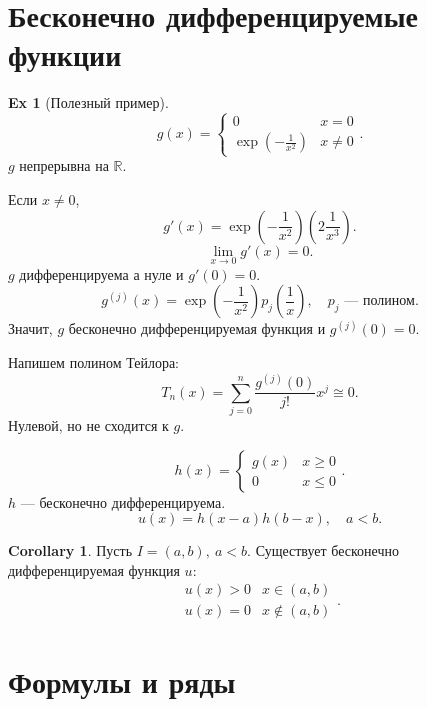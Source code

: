 \documentclass[11pt]{book}
\newcommand{\R}{\mathbb{R}}
\renewcommand{\le}{\leqslant}
\renewcommand{\ge}{\geqslant}
\theoremstyle{definition}
\theoremstyle{plain}
\theoremstyle{plain}
\theoremstyle{definition}
\newtheorem*{ex}{Ex}
\newtheorem*{cor}{Corollary}
\theoremstyle{remark}
\begin{document}
\section{Бесконечно дифференцируемые функции}
\begin{ex}[Полезный пример]
    \[
	g(x) = \left\{
	    \begin{array}{ll}
		0 & x = 0 \\
		\exp\left(-\frac{1}{x^2}\right) & x \ne 0
	\end{array}\right.
    .\]
    $ g $ непрерывна на $ \R$.

    Если $ x \ne 0$, \[
	g'(x) = \exp\left(-\frac{1}{x^2} \right)\left(2 \frac{1}{x^3}\right)
    .\]
    \[
	\lim_{x \to  0}  g'(x) = 0
    .\]
    $ g$  дифференцируема а нуле и $ g'(0) = 0$.
    \[
	g^{(j)} (x) = \exp\left(-\frac{1}{x^2}\right) p_j\left(\frac{1}{x}\right), \quad p_j \text{ --- полином}
    .\]
    Значит, $ g$ бесконечно дифференцируемая функция и $ g^{(j)} (0) = 0$.


    Напишем полином Тейлора:
    \[
	T_n(x) =\sum_{j=0}^{n} \frac{g^{(j)} (0)}{j!}x^{j} \cong 0
    .\]
    Нулевой, но не сходится к $ g$.

    \[
	h(x) = \left \{
	    \begin{array}{ll}
		g(x) & x \ge  0\\
		0 & x \le 0
	    \end{array}
	\right .
    .\]
    $ h$ --- бесконечно дифференцируема.
    \[
	u(x) = h(x-a) h(b-x), \quad a<b
    .\]
\end{ex}
\begin{cor}
    Пусть $ I = (a, b), ~ a< b$. Существует бесконечно дифференцируемая функция $ u:$
    \[
	\begin{array}{ll}
	    u(x) >0 & x \in  (a, b) \\
	    u(x) = 0 & x \not\in (a,b)
	\end{array}
    .\]
\end{cor}

\section{Формулы и ряды}
\end{document}
